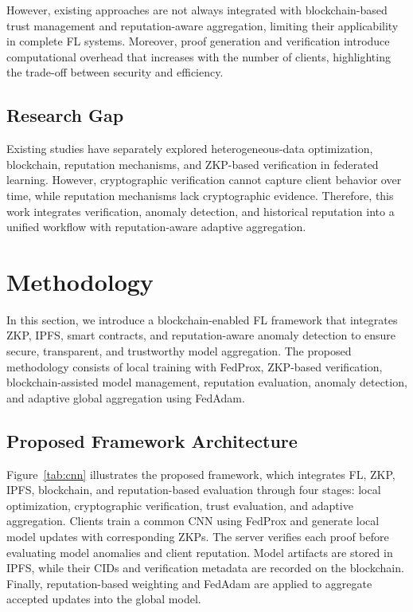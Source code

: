 \documentclass[conference, a4paper]{IEEEtran}
\begin{document}
However, existing approaches are not always integrated with blockchain-based trust management and reputation-aware aggregation, limiting their applicability in complete FL systems. Moreover, proof generation and verification introduce computational overhead that increases with the number of clients, highlighting the trade-off between security and efficiency.

\subsection{Research Gap}
Existing studies have separately explored heterogeneous-data optimization, blockchain, reputation mechanisms, and ZKP-based verification in federated learning. However, cryptographic verification cannot capture client behavior over time, while reputation mechanisms lack cryptographic evidence. Therefore, this work integrates verification, anomaly detection, and historical reputation into a unified workflow with reputation-aware adaptive aggregation.

\section{Methodology}\label{methodology}
In this section, we introduce a blockchain-enabled FL framework that integrates ZKP, IPFS, smart contracts, and reputation-aware anomaly detection to ensure secure, transparent, and trustworthy model aggregation. The proposed methodology consists of local training with FedProx, ZKP-based verification, blockchain-assisted model management, reputation evaluation, anomaly detection, and adaptive global aggregation using FedAdam.

\subsection{Proposed Framework Architecture}\label{AA}

Figure~\ref{tab:cnn} illustrates the proposed framework, which integrates FL, ZKP, IPFS, blockchain, and reputation-based evaluation through four stages: local optimization, cryptographic verification, trust evaluation, and adaptive aggregation. Clients train a common CNN using FedProx and generate local model updates with corresponding ZKPs. The server verifies each proof before evaluating model anomalies and client reputation. Model artifacts are stored in IPFS, while their CIDs and verification metadata are recorded on the blockchain. Finally, reputation-based weighting and FedAdam are applied to aggregate accepted updates into the global model.
\end{document}
